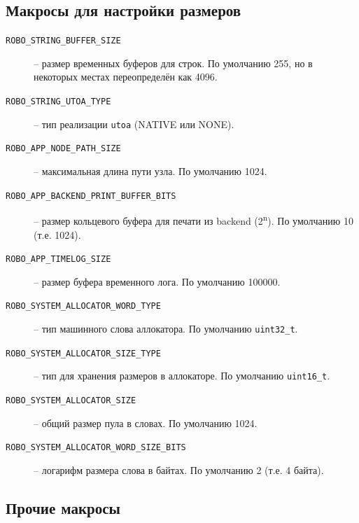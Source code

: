 \documentclass[a4paper,12pt]{article}
\begin{document}
\subsection{Макросы для настройки размеров}

\begin{description}
    \item[\texttt{ROBO\_STRING\_BUFFER\_SIZE}] -- размер временных буферов для строк. По умолчанию 255, но в некоторых местах переопределён как 4096.
    \item[\texttt{ROBO\_STRING\_UTOA\_TYPE}] -- тип реализации \texttt{utoa} (NATIVE или NONE).
    \item[\texttt{ROBO\_APP\_NODE\_PATH\_SIZE}] -- максимальная длина пути узла. По умолчанию 1024.
    \item[\texttt{ROBO\_APP\_BACKEND\_PRINT\_BUFFER\_BITS}] -- размер кольцевого буфера для печати из backend (2\textsuperscript{n}). По умолчанию 10 (т.е. 1024).
    \item[\texttt{ROBO\_APP\_TIMELOG\_SIZE}] -- размер буфера временного лога. По умолчанию 100000.
    \item[\texttt{ROBO\_SYSTEM\_ALLOCATOR\_WORD\_TYPE}] -- тип машинного слова аллокатора. По умолчанию \texttt{uint32\_t}.
    \item[\texttt{ROBO\_SYSTEM\_ALLOCATOR\_SIZE\_TYPE}] -- тип для хранения размеров в аллокаторе. По умолчанию \texttt{uint16\_t}.
    \item[\texttt{ROBO\_SYSTEM\_ALLOCATOR\_SIZE}] -- общий размер пула в словах. По умолчанию 1024.
    \item[\texttt{ROBO\_SYSTEM\_ALLOCATOR\_WORD\_SIZE\_BITS}] -- логарифм размера слова в байтах. По умолчанию 2 (т.е. 4 байта).
\end{description}

\subsection{Прочие макросы}
\end{document}
